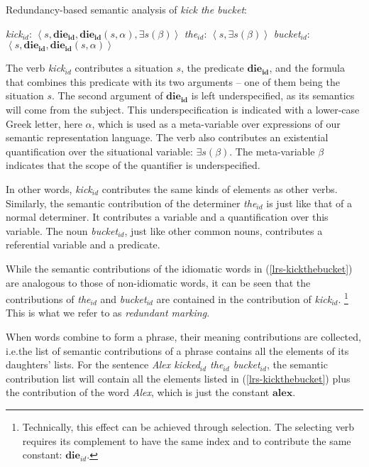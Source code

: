 \documentclass[output=paper]{langsci/langscibook}
\begin{document}
\begin{exe}
\ex Redundancy-based semantic analysis of \textit{kick the bucket}:\label{lrs-kickthebucket}
\begin{xlist}
\ex \textit{kick}$_{id}$: $\left< s, \mathbf{die_{id}}, \mathbf{die_{id}}(s,\alpha), \exists s (\beta) \right>$\label{lrs-kick}
\ex \textit{the}$_{id}$: $\left< s, \exists s (\beta) \right>$\label{lrs-the}
\ex \textit{bucket}$_{id}$: $\left< s, \mathbf{die_{id}}, \mathbf{die_{id}}(s,\alpha) \right>$\label{lrs-bucket}
\end{xlist}
\end{exe}

The verb \textit{kick$_{id}$} contributes a situation $s$, the predicate $\mathbf{die_{id}}$, and the formula that combines this predicate with its two arguments -- one of them being the situation $s$. The second argument of $\mathbf{die_{id}}$ is left  underspecified, as its semantics will come from the subject. This under\-specification is indicated with a lower-case Greek letter, here $\alpha$, which is used as a meta-variable over expressions of our semantic representation language. The verb also contributes an existential quantification over the situational variable: $\exists s (\beta)$. The meta-variable $\beta$ indicates that the scope of the quantifier is underspecified. 

In other words, \textit{kick$_{id}$} contributes the same kinds of elements as other verbs. Similarly, the semantic contribution of the determiner \textit{the$_{id}$} is just like that of a normal determiner. It contributes a variable and a quantification over this variable. The noun \textit{bucket$_{id}$}, just like other common nouns, contributes a referential variable and a predicate.
 
\newpage 
While the semantic contributions of the idiomatic words in (\ref{lrs-kickthebucket}) are analogous to those of non-idiomatic words, it can be seen that the contributions of \textit{the}$_{id}$ and \textit{bucket}$_{id}$ are contained in the contribution of \textit{kick}$_{id}$.%
\footnote{Technically, this effect can be achieved through selection. The selecting verb requires its complement to have the same index and to contribute the same constant: $\mathbf{die}_{id}$.}
%
This is what we refer to as \emph{redundant marking}.

When words combine to form a phrase, their meaning contributions are collected, i.e.\@ the list of semantic contributions of a phrase contains all the elements of its daughters' lists. 
For the sentence \textit{Alex kicked$_{id}$ the$_{id}$ bucket$_{id}$}, the semantic contribution list will contain all the elements listed in (\ref{lrs-kickthebucket}) plus the contribution of the word \textit{Alex}, which is just the constant $\mathbf{alex}$.
\end{document}
